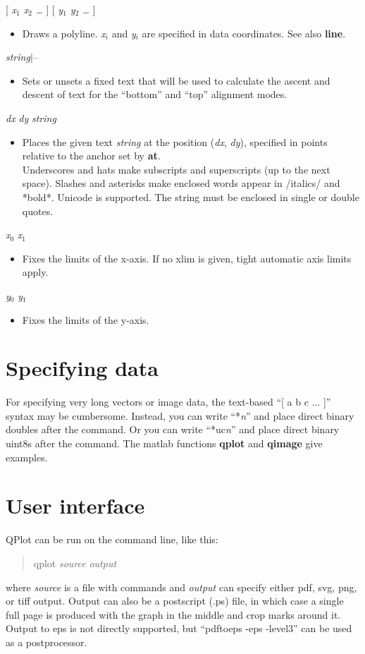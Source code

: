 \documentclass[11pt]{article}
\def\cmd#1#2{\noindent {\bf #1} #2\par}
\def\expl#1{\kern-8pt\begin{itemize}\item[]#1\end{itemize}}
\def\cref#1{{\bf #1}}
\def\bar{{$|$}}
\begin{document}
\cmd{plot}{[ \emph{x$_1$ x$_2$ \ldots} ] [ \emph{y$_1$ y$_2$ \ldots}
]}
\expl{Draws a polyline. \emph{x$_i$}
  and \emph{y$_i$} are specified in data coordinates. See also
  \cref{line}.}

\cmd{reftext}{\emph{string}\bar{}--}
\expl{Sets or unsets a fixed text that will be used to calculate the
  ascent and descent of text for the ``bottom'' and ``top'' alignment
  modes.}

\cmd{text}{\emph{dx} \emph{dy} \emph{string}}
\expl{Places the given text \emph{string} at the position (\emph{dx},
  \emph{dy}), specified in points relative to the anchor set by
  \cref{at}.\\
  Underscores and hats  make
  subscripts and superscripts (up to the next space). Slashes and
  asterisks make enclosed words appear in /italics/
  and *bold*. Unicode is supported. The string must be enclosed in single or double quotes.}

\cmd{xlim}{\emph{x$_0$} \emph{x$_1$}}
\expl{Fixes the limits of the x-axis. If no xlim is given, tight
  automatic axis limits apply.}

\cmd{ylim}{\emph{y$_0$} \emph{y$_1$}}
\expl{Fixes the limits of the y-axis.}

\section{Specifying data}

For specifying very long vectors or image data, the text-based ``[ a b c ... ]''
syntax may be cumbersome. Instead, you can write ``*\emph{n}'' and
place direct binary doubles after the command. Or you can write
``*uc\emph{n}'' and place direct binary uint8s after the command. The
matlab functions \cref{qplot} and \cref{qimage} give examples.

\section{User interface}

QPlot can be run on the command line, like this:
\begin{quotation}
qplot \emph{source} \emph{output}
\end{quotation}
 where \emph{source} is a file with commands and
\emph{output} can specify either pdf, svg, png, or tiff output. Output
can also be a postscript (.ps) file, in which case a single full page
is produced with the graph in the middle and crop marks around
it. Output to eps is not directly supported, but ``pdftoeps -eps -level3'' can
be used as a postprocessor.
\end{document}
